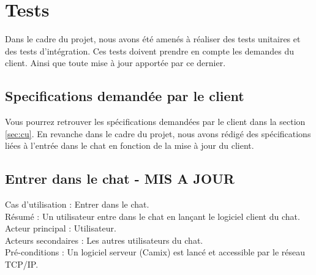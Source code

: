 %

\section{Tests}
\label{sec:t}

\medskip
Dans le cadre du projet, nous avons été amenés à réaliser des tests unitaires et des tests d'intégration.
Ces tests doivent prendre en compte les demandes du client.
Ainsi que toute mise à jour apportée par ce dernier.

\subsection{Specifications demandée par le client}
\label{sec:t:specclient}

Vous pourrez retrouver les spécifications demandées par le client dans la section \ref{sec:cu}.
En revanche dans le cadre du projet, nous avons rédigé des spécifications liées à l'entrée dans le chat en fonction de la mise à jour du client.


\subsection{Entrer dans le chat - MIS A JOUR}
\label{sec:t:entrerchat}

\noindent
Cas d'utilisation : Entrer dans le chat.\\
Résumé : Un utilisateur entre dans le chat en lançant le logiciel client du chat.\\
Acteur principal : Utilisateur.\\
Acteurs secondaires : Les autres utilisateurs du chat.\\
Pré-conditions : Un logiciel serveur (Camix) est lancé et accessible par le réseau TCP/IP.


